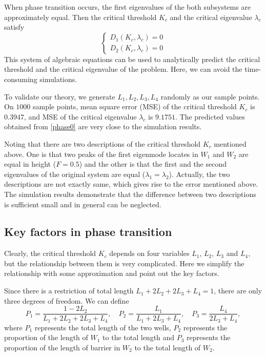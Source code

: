 \documentclass[a4paper,11pt]{article}
\begin{document}
When phase transition occurs, the first eigenvalues of the both subsystems are approximately equal. Then the critical threshold $K_c$ and the critical eigenvalue $\lambda_c$ satisfy
\begin{equation}\label{phase0}
\left\{
\begin{split}
D_1(K_c, \lambda_c) = 0 \\
D_2(K_c, \lambda_c) = 0
\end{split}
\right.
\end{equation}
This system of algebraic equations can be used to analytically predict the critical threshold and the critical eigenvalue of the problem. Here, we can avoid the time-consuming simulations.

To validate our theory, we generate $L_1, L_2, L_3, L_4$ randomly as our sample points. On $1000$ sample points, mean square error (MSE) of the critical threshold $K_c$ is $0.3947$, and MSE of the critical eigenvalue $\lambda_c$ is $9.1751$. The predicted values obtained from \eqref{phase0} are very close to the simulation results.

Noting that there are two descriptions of the critical threshold $K_c$ mentioned above. One is that two peaks of the first eigenmode locates in $W_1$ and $W_2$ are equal in height ($F = 0.5$) and the other is that the first and the second eigenvalues of the original system are equal ($\lambda_1 = \lambda_2$). Actually, the two descriptions are not exactly same, which gives rise to the error mentioned above. The simulation results demonstrate that the difference between two descriptions is sufficient small and in general can be neglected.

\subsection{Key factors in phase transition}

Clearly, the critical threshold $K_c$ depends on four variables $L_1$, $L_2$, $L_3$ and $L_4$, but the relationship between them is very complicated. Here we simplify the relationship with some approximation and point out the key factors. 

Since there is a restriction of total length $L_1 + 2 L_2 + 2 L_3 + L_4 = 1$, there are only three degrees of freedom. We can define 
\begin{equation}
P_1 = \frac{1 - 2 L_2}{L_1 + 2 L_2 + 2 L_3 + L_4}, \quad P_2 = \frac{L_1}{L_1 + 2 L_3 + L_4}, \quad P_3 = \frac{L_4}{2 L_3 + L_4},
\end{equation}
where $P_1$ represents the total length of the two wells, $P_2$ represents the proportion of the length of $W_1$ to the total length and $P_3$ represents the proportion of the length of barrier in $W_2$ to the total length of $W_2$.
\end{document}
